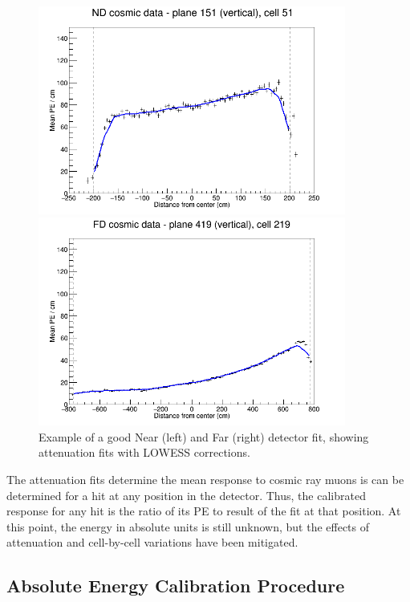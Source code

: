 \begin{figure}
  \includegraphics[width=0.9\textwidth]{figures/plots/reco/calib_totfit_data_inX_151_051}

  \includegraphics[width=0.9\textwidth]{figures/plots/reco/calib_totfit_data_inX_419_219}
  \caption[]{Example of a good Near (left) and Far (right) detector fit,
  showing attenuation fits with LOWESS corrections.}\label{calib_atten}
\end{figure}

The attenuation fits determine the mean response to cosmic ray muons is
can be determined for a hit at any position in the detector.
Thus, the calibrated response for any hit is the ratio of its PE to result of
the fit at that position.  At this point, the energy in absolute units is
still unknown, but the effects of attenuation and cell-by-cell variations
have been mitigated.

\subsection{Absolute Energy Calibration Procedure}

